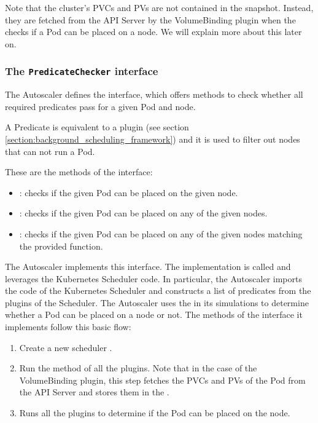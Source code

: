 Note that the cluster's PVCs and PVs are not contained in the snapshot. Instead,
they are fetched from the API Server by the VolumeBinding plugin when the
 checks if a Pod can be placed on a node. We will explain
more about this later on.

\subsubsection{The \texttt{PredicateChecker} interface}

The Autoscaler defines the  interface, which offers methods
to check whether all required predicates pass for a given Pod and node.

A Predicate is equivalent to a  plugin (see section
\ref{section:background_scheduling_framework}) and it is used to filter out
nodes that can not run a Pod.

These are the methods of the interface:
\begin{itemize}
      \tightlist
      \item {}: checks if the given Pod can be placed on the
            given node.
      \item {}: checks if the given Pod can be placed on any of
            the given nodes.
      \item {}: checks if the given Pod can be placed on
            any of the given nodes matching the provided function.
\end{itemize}


The Autoscaler implements this interface. The implementation is called
 and leverages the Kubernetes Scheduler code.
In particular, the Autoscaler imports the code of the Kubernetes Scheduler and
constructs a list of predicates from the  plugins of the Scheduler.
The Autoscaler uses the  in its simulations
to determine whether a Pod can be placed on a node or not. The methods of the
interface it implements follow this basic flow:
\begin{enumerate}
      \tightlist
      \item Create a new scheduler .
      \item Run the  method of all the plugins. Note that in the
            case of the VolumeBinding plugin, this step fetches the PVCs and PVs
            of the Pod from the API Server and stores them in the
            .
      \item Runs all the  plugins to determine if the Pod can be
            placed on the node.
\end{enumerate}

